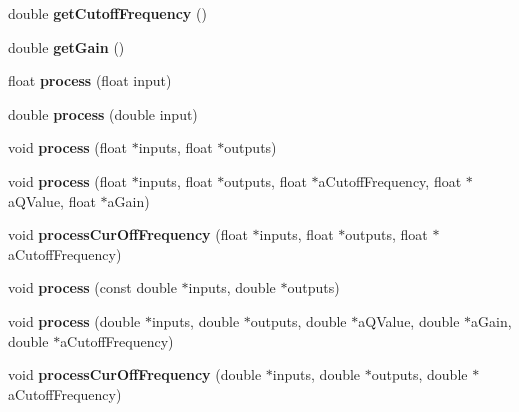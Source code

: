 \begin{DoxyCompactItemize}
\item 
\hypertarget{class_filter_biquad_a810b01c088f4ac11d607693b9efcfe38}{double {\bfseries get\-Cutoff\-Frequency} ()}\label{class_filter_biquad_a810b01c088f4ac11d607693b9efcfe38}

\item 
\hypertarget{class_filter_biquad_a4f7bb6380e6fd4eed650d606d7f9bdd9}{double {\bfseries get\-Gain} ()}\label{class_filter_biquad_a4f7bb6380e6fd4eed650d606d7f9bdd9}

\item 
\hypertarget{class_filter_biquad_acc471d3980c676047f6e89595031da5e}{float {\bfseries process} (float input)}\label{class_filter_biquad_acc471d3980c676047f6e89595031da5e}

\item 
\hypertarget{class_filter_biquad_adbda4a151851c4f42e977ddc1023199d}{double {\bfseries process} (double input)}\label{class_filter_biquad_adbda4a151851c4f42e977ddc1023199d}

\item 
\hypertarget{class_filter_biquad_a52ca7291f7f3dbc2891f77c88f156ab9}{void {\bfseries process} (float $\ast$inputs, float $\ast$outputs)}\label{class_filter_biquad_a52ca7291f7f3dbc2891f77c88f156ab9}

\item 
\hypertarget{class_filter_biquad_afed40c17c80f547c5d65a5892f51caa0}{void {\bfseries process} (float $\ast$inputs, float $\ast$outputs, float $\ast$a\-Cutoff\-Frequency, float $\ast$a\-Q\-Value, float $\ast$a\-Gain)}\label{class_filter_biquad_afed40c17c80f547c5d65a5892f51caa0}

\item 
\hypertarget{class_filter_biquad_a655f86254676245ae6054ffe14be7524}{void {\bfseries process\-Cur\-Off\-Frequency} (float $\ast$inputs, float $\ast$outputs, float $\ast$a\-Cutoff\-Frequency)}\label{class_filter_biquad_a655f86254676245ae6054ffe14be7524}

\item 
\hypertarget{class_filter_biquad_a462164fcd458d8e6120206e2f3a0fea4}{void {\bfseries process} (const double $\ast$inputs, double $\ast$outputs)}\label{class_filter_biquad_a462164fcd458d8e6120206e2f3a0fea4}

\item 
\hypertarget{class_filter_biquad_aa3ad9a20917ed94624279c8ac05ead5f}{void {\bfseries process} (double $\ast$inputs, double $\ast$outputs, double $\ast$a\-Q\-Value, double $\ast$a\-Gain, double $\ast$a\-Cutoff\-Frequency)}\label{class_filter_biquad_aa3ad9a20917ed94624279c8ac05ead5f}

\item 
\hypertarget{class_filter_biquad_a0a09d8734484568663521d2a1a37a6da}{void {\bfseries process\-Cur\-Off\-Frequency} (double $\ast$inputs, double $\ast$outputs, double $\ast$a\-Cutoff\-Frequency)}\label{class_filter_biquad_a0a09d8734484568663521d2a1a37a6da}

\end{DoxyCompactItemize}

